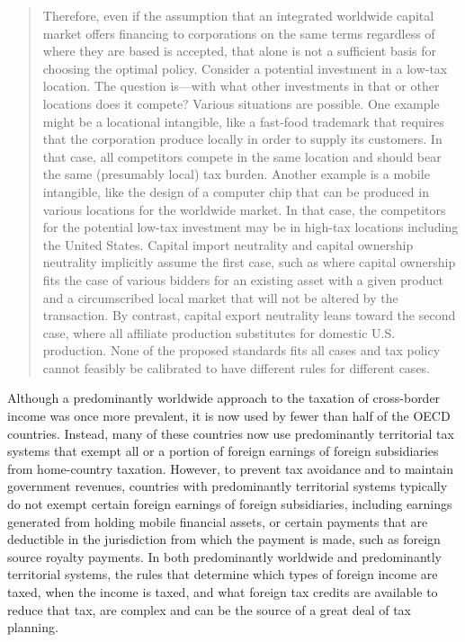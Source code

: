 \begin{select}
\begin{framed}
\begin{quote}
Therefore, even if the assumption that an integrated worldwide capital market 
offers financing to corporations on the same terms regardless of where they are based is 
accepted, that alone is not a sufficient basis for choosing the optimal policy.  Consider a 
potential investment in a low-tax location.  The question is---with what other investments 
in that or other locations does it compete?  Various situations are possible.  One example might be a locational intangible, like a fast-food trademark that requires that the corporation produce locally in order to supply its customers.  In that case, all competitors 
compete in the same location and should bear the same (presumably local) tax burden.  
Another example is a mobile intangible, like the design of a computer chip that can be 
produced in various locations for the worldwide market.  In that case, the competitors for 
the potential low-tax investment may be in high-tax locations including the United States.  
Capital import neutrality and capital ownership neutrality implicitly assume the first case, 
such as where capital ownership fits the case of various bidders for an existing asset with 
a given product and a circumscribed local market that will not be altered by the 
transaction.  By contrast, capital export neutrality leans toward the second case, where all 
affiliate production substitutes for domestic U.S. production.  None of the proposed 
standards fits all cases and tax policy cannot feasibly be calibrated to have different rules 
for different cases. 
\end{quote}
\end{framed} 
   
Although a predominantly worldwide approach to the taxation of cross-border 
income was once more prevalent, it is now used by fewer than half of the OECD 
countries.  Instead, many of these countries now use predominantly territorial tax systems 
that exempt all or a portion of foreign earnings of foreign subsidiaries from home-country 
taxation.  However, to prevent tax avoidance and to maintain government revenues, 
countries with predominantly territorial systems typically do not exempt certain foreign 
earnings of foreign subsidiaries, including earnings generated from holding mobile 
financial assets, or certain payments that are deductible in the jurisdiction from which the 
payment is made, such as foreign source royalty payments.  In both predominantly 
worldwide and predominantly territorial systems, the rules that determine which types of 
foreign income are taxed, when the income is taxed, and what foreign tax credits are 
available to reduce that tax, are complex and can be the source of a great deal of tax 
planning.   
 

\end{select}
